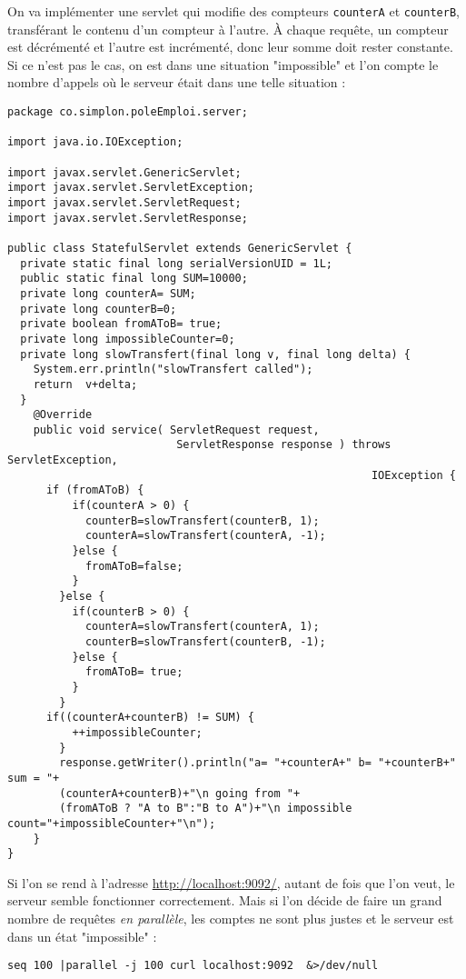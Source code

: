 \documentclass[11pt]{article}
\begin{document}
On va implémenter une servlet qui modifie des compteurs \texttt{counterA} et
\texttt{counterB}, transférant le contenu d'un compteur à l'autre. À chaque requête, un
compteur est décrémenté et l'autre est incrémenté, donc leur somme doit rester
constante. Si ce n'est pas le cas, on est dans une situation "impossible" et
l'on compte le nombre d'appels où le serveur était dans une telle situation :

\begin{verbatim}
package co.simplon.poleEmploi.server;

import java.io.IOException;

import javax.servlet.GenericServlet;
import javax.servlet.ServletException;
import javax.servlet.ServletRequest;
import javax.servlet.ServletResponse;

public class StatefulServlet extends GenericServlet {
  private static final long serialVersionUID = 1L;
  public static final long SUM=10000;
  private long counterA= SUM;
  private long counterB=0;
  private boolean fromAToB= true;
  private long impossibleCounter=0;
  private long slowTransfert(final long v, final long delta) {
    System.err.println("slowTransfert called");
    return	v+delta;	
  }
    @Override
    public void service( ServletRequest request,
                          ServletResponse response ) throws ServletException,
                                                        IOException {
      if (fromAToB) {
          if(counterA > 0) {
            counterB=slowTransfert(counterB, 1);
            counterA=slowTransfert(counterA, -1);
          }else {
            fromAToB=false;
          }
        }else {
          if(counterB > 0) {
            counterA=slowTransfert(counterA, 1);
            counterB=slowTransfert(counterB, -1);
          }else {
            fromAToB= true;
          }
        }
      if((counterA+counterB) != SUM) {
          ++impossibleCounter;
        }
        response.getWriter().println("a= "+counterA+" b= "+counterB+" sum = "+
        (counterA+counterB)+"\n going from "+
        (fromAToB ? "A to B":"B to A")+"\n impossible count="+impossibleCounter+"\n");        
    }
}
\end{verbatim}

Si l'on se rend à l'adresse \url{http://localhost:9092/}, autant de fois que l'on
veut, le serveur semble fonctionner correctement. Mais si l'on décide de faire
un grand nombre de requêtes \emph{en parallèle}, les comptes ne sont plus justes et le
serveur est dans un état "impossible" :
\begin{verbatim}
seq 100 |parallel -j 100 curl localhost:9092  &>/dev/null
\end{verbatim}
\end{document}
